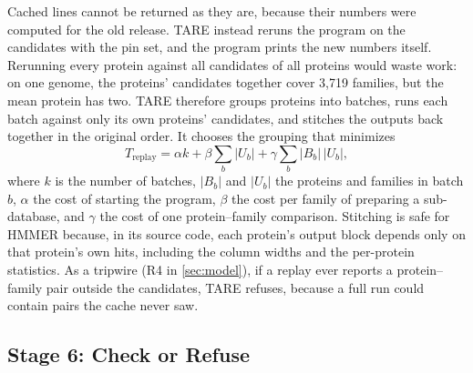 \documentclass[letterpaper,twocolumn,10pt]{article}
\theoremstyle{definition}
\newcommand{\sys}{TARE\xspace}
\newcommand{\sys}{PARE\xspace}
\begin{document}
Cached lines cannot be returned as they are, because their numbers were computed for the old release. \sys instead
reruns the program on the candidates with the pin set, and the program prints the new numbers itself. Rerunning every
protein against all candidates of all proteins would waste work: on one genome, the proteins' candidates together
cover 3{,}719 families, but the mean protein has two.
\sys therefore groups proteins into batches, runs each batch
against only its own proteins' candidates, and stitches the outputs back together in the original order. It chooses
the grouping that minimizes
\begin{equation}
T_{\text{replay}} = \alpha k + \beta \sum_b |U_b| + \gamma \sum_b |B_b|\,|U_b|,
\label{eq:batch}
\end{equation}
where $k$ is the number of batches, $|B_b|$ and $|U_b|$ the proteins and families in batch $b$, $\alpha$ the cost of
starting the program, $\beta$ the cost per family of preparing a sub\nobreakdash-database, and $\gamma$ the cost of one
protein--family comparison. Stitching is safe for HMMER because, in its source code, each protein's output block
depends only on that protein's own hits, including the column widths and the per\nobreakdash-protein statistics. As a tripwire
(R4 in \cref{sec:model}), if a replay ever reports a protein--family pair outside the candidates, \sys refuses, because
a full run could contain pairs the cache never saw.

\subsection{Stage 6: Check or Refuse}
\label{sec:check}
\end{document}
